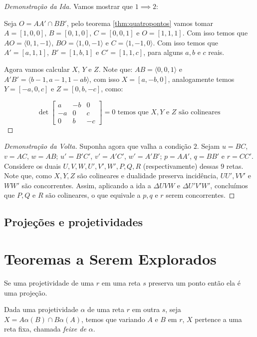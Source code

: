 \begin{proof}[Demonstração da Ida]
Vamos mostrar que $1 \implies 2$:

Seja $O = AA' \cap BB'$, pelo teorema \ref{thm:quatropontos} vamos tomar $A = [1, 0, 0]$, $B = [0, 1, 0]$, $C = [0, 0, 1]$ e $O = [1, 1, 1]$. Com isso temos que $AO = \langle 0, 1, -1 \rangle$, $BO = \langle 1, 0, -1 \rangle$ e $C = \langle 1, -1, 0 \rangle$. Com isso temos que $A' = [a,1,1]$, $B' = [1,b,1]$ e $C'= [1,1,c]$, para alguns $a,b$ e $c$ reais. 

Agora vamos calcular $X$, $Y$ e $Z$. Note que: $AB = \langle 0,0,1 \rangle$ e $A'B' = \langle b-1,a-1,1-ab \rangle$, com isso $X = [a,-b,0]$, analogamente temos $Y = [-a,0,c]$ e $Z = [0,b,-c]$, como:

\[\det \begin{bmatrix} a & -b & 0 \\ -a & 0 & c \\ 0 & b & -c \end{bmatrix} = 0 \text{ temos que } X,Y \text{ e } Z \text{ são colineares } \]
\end{proof}

\begin{proof}[Demonstração da Volta]
Suponha agora que valha a condição $2$.
Sejam \(u = BC\), \(v = AC\), \(w = AB\); \(u' = B'C'\), \(v' = A'C'\), \(w' = A'B'\); \(p = AA'\), \(q = BB'\) e \(r = CC'\). Considere os duais $U,V,W,U',V',W',P,Q,R$ (respectivamente) dessas $9$ retas. Note que, como $X,Y,Z$ são colineares e dualidade preserva incidência, $UU', VV'$ e $WW'$ são concorrentes. Assim, aplicando a ida a $\Delta UVW$ e $\Delta U'V'W'$, concluímos que $P,Q$ e $R$ são colineares, o que equivale a $p,q$ e $r$ serem concorrentes.
\end{proof}

\subsection{Projeções e projetividades}

\newpage
\section{Teoremas a Serem Explorados}
\begin{lem}
Se uma projetividade de uma $r$ em uma reta $s$ preserva um ponto então ela é uma projeção.
\end{lem}

\begin{thm}
Dada uma projetividade $\alpha$ de uma reta $r$ em outra $s$, seja $X = A\alpha(B) \cap B\alpha(A)$, temos que variando $A$ e $B$ em $r$, $X$ pertence a uma reta fixa, chamada \emph{feixe de $\alpha$}.
\end{thm}

